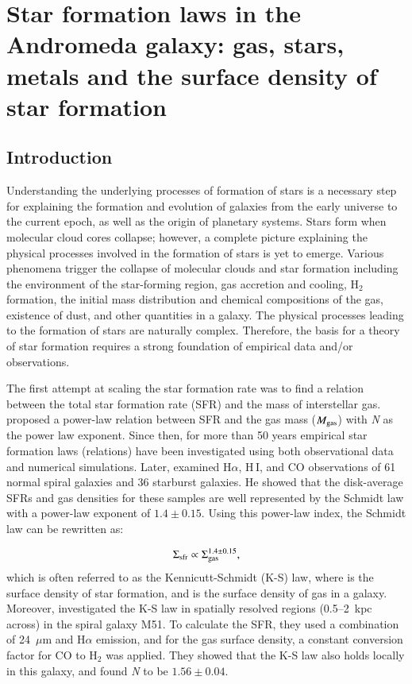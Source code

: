 \chapter[Star formation laws in M31]{Star formation laws in the Andromeda galaxy: gas, stars, metals and the surface density of star formation}
\label{ch: paper1}


\section{Introduction}
\label{sec: intro_sfl}

Understanding the underlying processes of formation of stars is a necessary step for explaining the formation and evolution of galaxies from the early universe to the current epoch, as well as the origin of planetary systems. Stars form when molecular cloud cores collapse; however, a complete picture explaining the physical processes involved in the formation of stars is yet to emerge. Various phenomena trigger the collapse of molecular clouds and star formation including the environment of the star-forming region, gas accretion and cooling, H$_2$ formation, the initial mass distribution and chemical compositions of the gas,  existence of dust, and other quantities in a galaxy. The physical processes leading to the formation of stars are naturally complex. Therefore, the basis for a theory of star formation requires a strong foundation of empirical data and/or observations.


The first attempt at scaling the star formation rate was to find a relation between the total star formation rate (SFR) and the mass of interstellar gas. \citet{Schmidt59} proposed a power-law relation between SFR and the gas mass ($M_{\rm gas}$) with {\it N} as the power law exponent. Since then, for more than 50 years empirical star formation laws (relations) have been investigated using both observational data and numerical simulations. Later, \citet{Kennicutt98a} examined H$\alpha$, H\,{\sc I}, and CO observations of 61 normal spiral galaxies and 36 starburst galaxies. He showed that the disk-average SFRs and gas densities for these samples are well represented by the Schmidt law with a power-law exponent of $1.4 \pm 0.15$. Using this power-law index, the Schmidt law can be rewritten as: 

\begin{equation}
\label{equ:ks_org}
\Sigma_{\mathrm{sfr }} \propto \Sigma_{\mathrm {gas }}^{1.4\pm0.15},
\end{equation}
\noindent which is often referred to as the Kennicutt-Schmidt (K-S) law, where \sigmasfr is the surface density of star formation, and \sigmagas is the surface density of gas in a galaxy. Moreover, \citet{Kennicutt07} investigated the K-S law in spatially resolved regions (0.5--2~kpc across) in the spiral galaxy M51. To calculate the SFR, they used a combination of 24~$\mu$m and H${\alpha}$ emission, and for the gas surface density, a constant conversion factor for CO to H$_2$ was applied. They showed that the K-S law also holds locally in this galaxy, and found {\it N} to be $1.56 \pm 0.04$.

